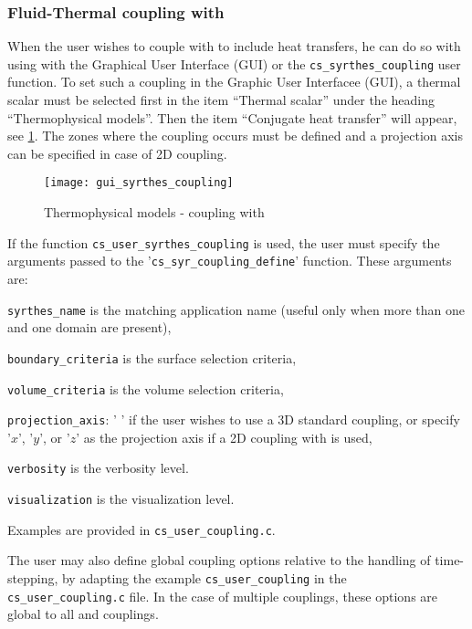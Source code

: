 {{{%
\subsubsection{Fluid-Thermal coupling with \syrthes}
When the user wishes to couple \CS with \syrthes to include heat transfers, he can do so with using with the Graphical User Interface (GUI) or the
\texttt{cs\_syrthes\_coupling} user function.
To set such a coupling in the Graphic User Interfacee (GUI), a thermal scalar must be
selected first in the item ``Thermal scalar'' under the heading ``Thermophysical models''.
Then the item ``Conjugate heat transfer'' will appear, see \figurename\ref{fig:syrthes}.
The zones where the coupling occurs must be defined and a projection axis can be
specified in case of 2D coupling.

\begin{figure}[ht]
\begin{center}
\texttt{[image: gui\_syrthes\_coupling]}
\caption{Thermophysical models - coupling with \syrthes}
\label{fig:syrthes}
\end{center}
\end{figure}

If the function \texttt{cs\_user\_syrthes\_coupling} is used, the user must
specify the arguments passed to the '\texttt{cs\_syr\_coupling\_define}' function.
 These arguments are:
\begin{list}{-}{}
 \item \texttt{syrthes\_name} is the matching \syrthes application name (useful only when more than one \syrthes and one \CS domain are present),
 \item \texttt{boundary\_criteria} is the surface selection criteria,
 \item \texttt{volume\_criteria} is the volume selection criteria,
 \item \texttt{projection\_axis}: ' ' if the user wishes to use a 3D standard coupling,
 or specify '$x$', '$y$', or '$z$' as the projection axis if a 2D coupling with \syrthes is used,
 \item \texttt{verbosity} is the verbosity level.
 \item \texttt{visualization} is the visualization level.
\end{list}
Examples are provided in \texttt{cs\_user\_coupling.c}.

The user may also define global coupling options relative to the handling of
time-stepping, by adapting the example \texttt{cs\_user\_coupling}
in the \texttt{cs\_user\_coupling.c} file. In the case of multiple couplings,
these options are global to all \syrthes and \CS couplings.

}}}
